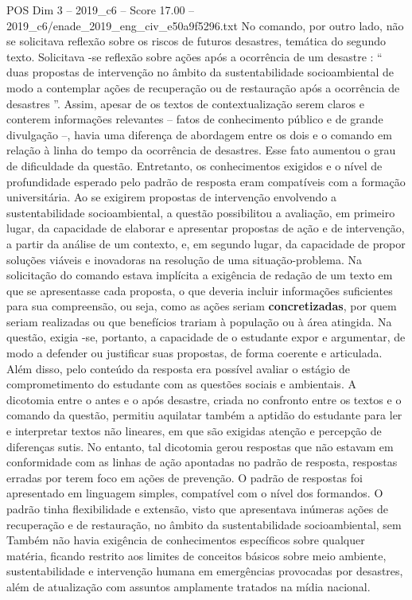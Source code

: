 \begin{textsample}{POS Dim 3 – 2019\_c6 – Score 17.00 – 2019\_c6/enade\_2019\_eng\_civ\_e50a9f5296.txt}
No comando, por outro lado, não se solicitava reflexão sobre os riscos de futuros desastres, temática do segundo texto.
Solicitava -se reflexão sobre ações após a ocorrência de um desastre : “ duas propostas de intervenção no âmbito da sustentabilidade socioambiental de modo a contemplar ações de recuperação ou de restauração após a ocorrência de desastres ”.
Assim, apesar de os textos de contextualização serem claros e conterem informações relevantes – fatos de conhecimento público e de grande divulgação –, havia uma diferença de abordagem entre os dois e o comando em relação à linha do tempo da ocorrência de desastres.
Esse fato aumentou o grau de dificuldade da questão.
Entretanto, os conhecimentos exigidos e o nível de profundidade esperado pelo padrão de resposta eram compatíveis com a formação universitária.
Ao se exigirem propostas de intervenção envolvendo a sustentabilidade socioambiental, a questão possibilitou a avaliação, em primeiro lugar, da capacidade de elaborar e apresentar propostas de ação e de intervenção, a partir da análise de um contexto, e, em segundo lugar, da capacidade de propor soluções viáveis e inovadoras na resolução de uma situação-problema.
Na solicitação do comando estava implícita a exigência de redação de um texto em que se apresentasse cada proposta, o que deveria incluir informações suficientes para sua compreensão, ou seja, como as ações seriam \textbf{concretizadas}, por quem seriam realizadas ou que benefícios trariam à população ou à área atingida.
Na questão, exigia -se, portanto, a capacidade de o estudante expor e argumentar, de modo a defender ou justificar suas propostas, de forma coerente e articulada.
Além disso, pelo conteúdo da resposta era possível avaliar o estágio de comprometimento do estudante com as questões sociais e ambientais.
A dicotomia entre o antes e o após desastre, criada no confronto entre os textos e o comando da questão, permitiu aquilatar também a aptidão do estudante para ler e interpretar textos não lineares, em que são exigidas atenção e percepção de diferenças sutis.
No entanto, tal dicotomia gerou respostas que não estavam em conformidade com as linhas de ação apontadas no padrão de resposta, respostas erradas por terem foco em ações de prevenção.
O padrão de respostas foi apresentado em linguagem simples, compatível com o nível dos formandos.
O padrão tinha flexibilidade e extensão, visto que apresentava inúmeras ações de recuperação e de restauração, no âmbito da sustentabilidade socioambiental, sem Também não havia exigência de conhecimentos específicos sobre qualquer matéria, ficando restrito aos limites de conceitos básicos sobre meio ambiente, sustentabilidade e intervenção humana em emergências provocadas por desastres, além de atualização com assuntos amplamente tratados na mídia nacional.

\end{textsample}
